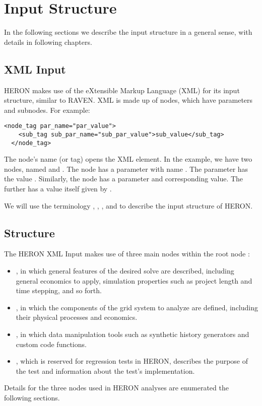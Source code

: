 \section{Input Structure}
In the following sections we describe the input structure in a general sense, with details in
following chapters.

\subsection{XML Input}
HERON makes use of the eXtensible Markup Language (XML) for its input structure, similar to RAVEN.
XML is made up of nodes, which have parameters and subnodes. For example:
\begin{lstlisting}[style=XML,morekeywords={class}]
  <node_tag par_name="par_value">
    <sub_tag sub_par_name="sub_par_value">sub_value</sub_tag>
  </node_tag>
\end{lstlisting}
The node's name (or tag) opens the XML element. In the example, we have two nodes, named
 and . The node  has a parameter with
name . The parameter  has the value
. Similarly, the  node has a parameter and
corresponding value. The  further has a value itself given by
.

We will use the terminology , , , and
 to describe the input structure of HERON.

\subsection{Structure}
The HERON XML Input makes use of three main nodes within the root node :
\begin{itemize}
  \item {}, in which general features of the desired solve are described, including general
    economics to apply, simulation properties such as project length and time stepping, and so forth.
  \item {}, in which the components of the grid system to analyze are defined,
    including their physical processes and economics.
  \item {}, in which data manipulation tools such as synthetic history
  generators and custom code functions.
  \item {}, which is reserved for regression tests in HERON, describes the purpose
  of the test and information about the test's implementation.
\end{itemize}

Details for the three nodes used in HERON analyses are enumerated the following sections.
